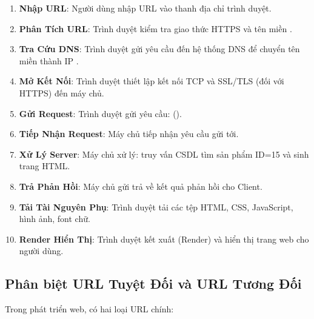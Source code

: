 \begin{conceptBox}
\begin{enumerate}[label=\textbf{\color{conceptBorder}Bước \arabic*:}, leftmargin=4.8em, itemsep=3pt, parsep=0pt, topsep=4pt]
    \item \textbf{Nhập URL}: Người dùng nhập URL vào thanh địa chỉ trình duyệt.
    \item \textbf{Phân Tích URL}: Trình duyệt kiểm tra giao thức HTTPS và tên miền .
    \item \textbf{Tra Cứu DNS}: Trình duyệt gửi yêu cầu đến hệ thống DNS để chuyển tên miền  thành IP .
    \item \textbf{Mở Kết Nối}: Trình duyệt thiết lập kết nối TCP và SSL/TLS (đối với HTTPS) đến máy chủ.
    \item \textbf{Gửi Request}: Trình duyệt gửi yêu cầu:  ().
    \item \textbf{Tiếp Nhận Request}: Máy chủ tiếp nhận yêu cầu gửi tới.
    \item \textbf{Xử Lý Server}: Máy chủ xử lý: truy vấn CSDL tìm sản phẩm ID=15 và sinh trang HTML.
    \item \textbf{Trả Phản Hồi}: Máy chủ gửi trả về kết quả phản hồi cho Client.
    \item \textbf{Tải Tài Nguyên Phụ}: Trình duyệt tải các tệp HTML, CSS, JavaScript, hình ảnh, font chữ.
    \item \textbf{Render Hiển Thị}: Trình duyệt kết xuất (Render) và hiển thị trang web cho người dùng.
\end{enumerate}
\end{conceptBox}

\subsection{Phân biệt URL Tuyệt Đối và URL Tương Đối}

Trong phát triển web, có hai loại URL chính:

